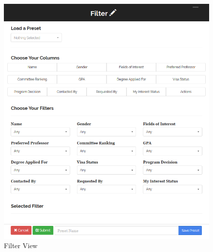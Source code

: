 \documentclass[fontsize=12pt,paper=letter,twoside]{scrartcl}
\begin{document}
\clearpage
\begin{figure}[!htb]
\begin{center}
\includegraphics[width=.99\textwidth]{images/prof/filter_view.png}
\end{center}
\caption{Filter View}
\label{fig:prof/filter_view}
\end{figure}
\end{document}

